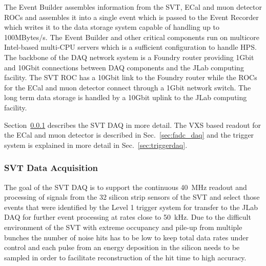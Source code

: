 The Event Builder assembles 
information from the SVT, ECal and muon detector ROCs and assembles it into a single 
event which is passed to the Event Recorder which writes it to the data storage system capable of handling up to 100MBytes/s. The Event Builder and other 
critical components run on multicore Intel-based multi-CPU servers which is a 
sufficient configuration to handle HPS. The backbone of the DAQ network system is a 
Foundry router providing 1Gbit and 10Gbit connections between DAQ components and 
the JLab computing facility. The SVT ROC has a 10Gbit link to the Foundry router while the 
ROCs for the ECal and muon detector connect through a 1Gbit network switch. The long 
term data storage is handled by a 10Gbit uplink to the JLab computing facility. 

Section~\ref{sec:svt_daq} describes the SVT DAQ in more detail. The VXS based readout for 
the ECal and muon detector is described in Sec.~\ref{sec:fadc_daq} and the trigger 
system is explained in more detail in Sec.~\ref{sec:triggerdaq}.

\subsubsection{SVT Data Acquisition}
\label{sec:svt_daq}
The goal of the SVT DAQ is to support the continuous 40~MHz readout and processing of signals from 
the 32 silicon strip sensors of the SVT and select those events that were identified by the 
Level 1 trigger system for transfer to the JLab DAQ for further event processing at rates 
close to 50~kHz. 
Due to the difficult environment of the SVT with extreme occupancy and pile-up from multiple bunches the number of noise hits has to be low to keep total data rates under control and 
each pulse from an energy deposition in the silicon needs to be sampled in order to facilitate 
reconstruction of the hit time to high accuracy. 

